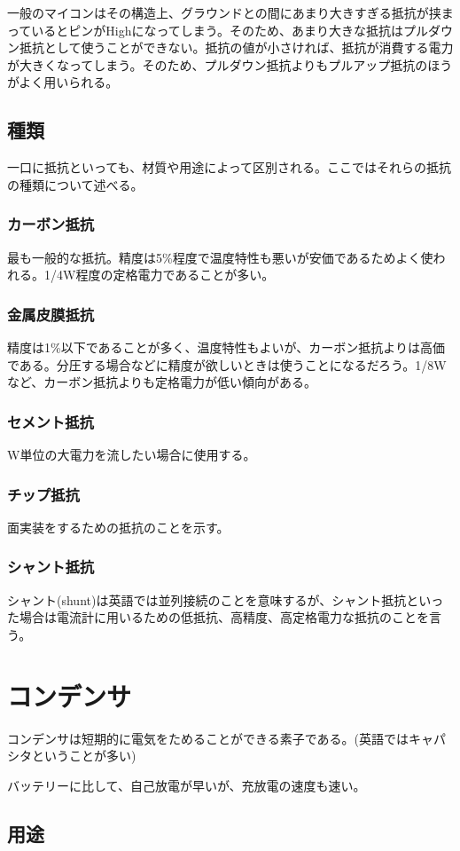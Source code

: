 \documentclass[a4paper,titlepage,here]{ujarticle}
\begin{document}
一般のマイコンはその構造上、グラウンドとの間にあまり大きすぎる抵抗が挟まっているとピンがHighになってしまう。そのため、あまり大きな抵抗はプルダウン抵抗として使うことができない。抵抗の値が小さければ、抵抗が消費する電力が大きくなってしまう。そのため、プルダウン抵抗よりもプルアップ抵抗のほうがよく用いられる。
\subsection{種類}
一口に抵抗といっても、材質や用途によって区別される。ここではそれらの抵抗の種類について述べる。
\subsubsection{カーボン抵抗}
最も一般的な抵抗。精度は5\%程度で温度特性も悪いが安価であるためよく使われる。1/4W程度の定格電力であることが多い。
\subsubsection{金属皮膜抵抗}
精度は1\%以下であることが多く、温度特性もよいが、カーボン抵抗よりは高価である。分圧する場合などに精度が欲しいときは使うことになるだろう。1/8Wなど、カーボン抵抗よりも定格電力が低い傾向がある。
\subsubsection{セメント抵抗}
W単位の大電力を流したい場合に使用する。
\subsubsection{チップ抵抗}
面実装をするための抵抗のことを示す。
\subsubsection{シャント抵抗}
シャント(shunt)は英語では並列接続のことを意味するが、シャント抵抗といった場合は電流計に用いるための低抵抗、高精度、高定格電力な抵抗のことを言う。
\section{コンデンサ}
コンデンサは短期的に電気をためることができる素子である。(英語ではキャパシタということが多い)

バッテリーに比して、自己放電が早いが、充放電の速度も速い。
\subsection{用途}
\end{document}
